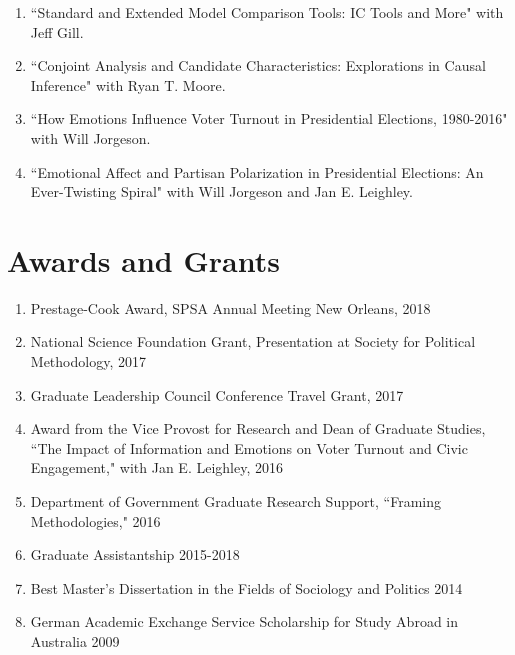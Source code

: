 \documentclass[10pt]{article}
\begin{document}
\begin{flushleft}
\begin{enumerate}[leftmargin=!,labelindent=20pt,itemindent=-20pt]
\item[] ``Standard and Extended Model Comparison Tools: IC Tools and More" with Jeff Gill.
\vspace{-0.27cm}
\item[] ``Conjoint Analysis and Candidate Characteristics: Explorations in Causal Inference" with Ryan T. Moore.
\vspace{-0.27cm}
\item[] ``How Emotions Influence Voter Turnout in Presidential Elections, 1980-2016" with Will Jorgeson.
\vspace{-0.27cm}
\item[] ``Emotional Affect and Partisan Polarization in Presidential Elections: An Ever-Twisting Spiral" with Will Jorgeson and Jan E. Leighley.
\end{enumerate}



\section*{Awards and Grants}

\begin{enumerate}[leftmargin=!,labelindent=20pt,itemindent=-20pt]
\item[] Prestage-Cook Award, SPSA Annual Meeting New Orleans, 2018
\vspace{-0.27cm}
\item[] National Science Foundation Grant, Presentation at Society for Political Methodology, 2017
\vspace{-0.27cm}
\item[] Graduate Leadership Council Conference Travel Grant, 2017
\vspace{-0.27cm}
\item[] Award from the Vice Provost for Research and Dean of Graduate Studies, ``The Impact of Information and Emotions on Voter Turnout and Civic Engagement," with Jan E. Leighley, 2016
\vspace{-0.27cm}
\item[] Department of Government Graduate Research Support, ``Framing Methodologies," 2016
\vspace{-0.27cm}
\item[] Graduate Assistantship 2015-2018
\vspace{-0.27cm}
\item[] Best Master's Dissertation in the Fields of Sociology and Politics 2014
\vspace{-0.27cm}
\item [] German Academic Exchange Service Scholarship for Study Abroad in Australia 2009
\end{enumerate}





\end{flushleft}
\end{document}
